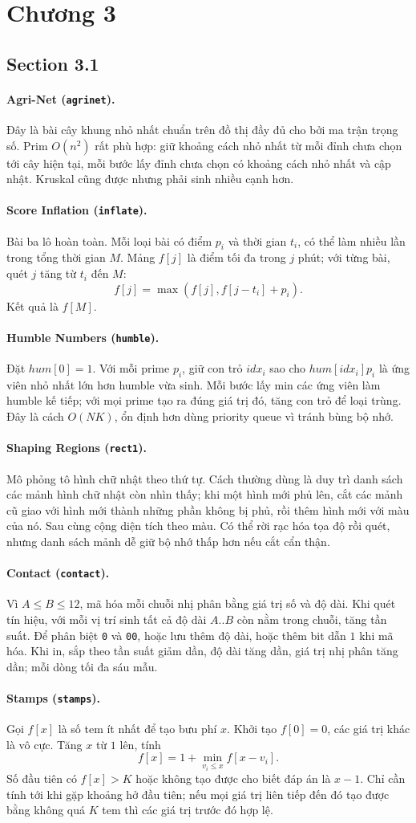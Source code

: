 \documentclass[11pt]{article}
\newcommand{\problem}[2]{\paragraph{#1 (\texttt{#2}).}}
\newcommand{\bigO}[1]{\ensuremath{O(#1)}}
\begin{document}
\section*{Chương 3}

\subsection*{Section 3.1}

\problem{Agri-Net}{agrinet}
Đây là bài cây khung nhỏ nhất chuẩn trên đồ thị đầy đủ cho bởi ma trận trọng số. Prim \(\bigO{n^2}\) rất phù hợp: giữ khoảng cách nhỏ nhất từ mỗi đỉnh chưa chọn tới cây hiện tại, mỗi bước lấy đỉnh chưa chọn có khoảng cách nhỏ nhất và cập nhật. Kruskal cũng được nhưng phải sinh nhiều cạnh hơn.

\problem{Score Inflation}{inflate}
Bài ba lô hoàn toàn. Mỗi loại bài có điểm \(p_i\) và thời gian \(t_i\), có thể làm nhiều lần trong tổng thời gian \(M\). Mảng \(f[j]\) là điểm tối đa trong \(j\) phút; với từng bài, quét \(j\) tăng từ \(t_i\) đến \(M\):
\[
  f[j]=\max(f[j],f[j-t_i]+p_i).
\]
Kết quả là \(f[M]\).

\problem{Humble Numbers}{humble}
Đặt \(hum[0]=1\). Với mỗi prime \(p_i\), giữ con trỏ \(idx_i\) sao cho \(hum[idx_i]p_i\) là ứng viên nhỏ nhất lớn hơn humble vừa sinh. Mỗi bước lấy min các ứng viên làm humble kế tiếp; với mọi prime tạo ra đúng giá trị đó, tăng con trỏ để loại trùng. Đây là cách \(\bigO{NK}\), ổn định hơn dùng priority queue vì tránh bùng bộ nhớ.

\problem{Shaping Regions}{rect1}
Mô phỏng tô hình chữ nhật theo thứ tự. Cách thường dùng là duy trì danh sách các mảnh hình chữ nhật còn nhìn thấy; khi một hình mới phủ lên, cắt các mảnh cũ giao với hình mới thành những phần không bị phủ, rồi thêm hình mới với màu của nó. Sau cùng cộng diện tích theo màu. Có thể rời rạc hóa tọa độ rồi quét, nhưng danh sách mảnh dễ giữ bộ nhớ thấp hơn nếu cắt cẩn thận.

\problem{Contact}{contact}
Vì \(A\le B\le12\), mã hóa mỗi chuỗi nhị phân bằng giá trị số và độ dài. Khi quét tín hiệu, với mỗi vị trí sinh tất cả độ dài \(A..B\) còn nằm trong chuỗi, tăng tần suất. Để phân biệt \texttt{0} và \texttt{00}, hoặc lưu thêm độ dài, hoặc thêm bit dẫn \(1\) khi mã hóa. Khi in, sắp theo tần suất giảm dần, độ dài tăng dần, giá trị nhị phân tăng dần; mỗi dòng tối đa sáu mẫu.

\problem{Stamps}{stamps}
Gọi \(f[x]\) là số tem ít nhất để tạo bưu phí \(x\). Khởi tạo \(f[0]=0\), các giá trị khác là vô cực. Tăng \(x\) từ \(1\) lên, tính
\[
  f[x]=1+\min_{v_i\le x} f[x-v_i].
\]
Số đầu tiên có \(f[x]>K\) hoặc không tạo được cho biết đáp án là \(x-1\). Chỉ cần tính tới khi gặp khoảng hở đầu tiên; nếu mọi giá trị liên tiếp đến đó tạo được bằng không quá \(K\) tem thì các giá trị trước đó hợp lệ.
\end{document}
